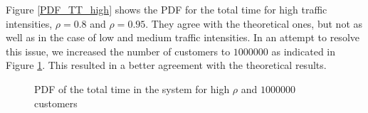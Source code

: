 \documentclass[12pt, a4paper]{article}
\begin{document}
Figure \ref{PDF_TT_high} shows the PDF for the total time for high traffic intensities, 
$\rho=0.8$ and $\rho=0.95$. They agree with the theoretical ones, but not as well as 
in the case of low and medium traffic intensities. In an attempt to resolve this issue,
we increased the number of customers to $1000000$ as indicated in Figure \ref{PDF_TT_high_more_cus}.
This resulted in a better agreement with the theoretical results.

\begin{figure}[H]
  \centering
  \hspace{0px}
  \caption{PDF of the total time in the system for high $\rho$ and $1000000$ customers}  
  \label{PDF_TT_high_more_cus}
\end{figure}
\end{document}

